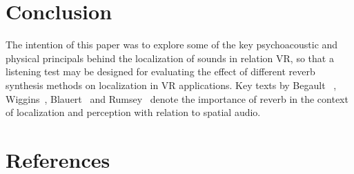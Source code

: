 \documentclass{svproc}
\begin{document}
\section{Conclusion}
The intention of this paper was to explore some of the key psychoacoustic and physical principals behind the localization of sounds in relation VR, so that a listening test may be designed for evaluating the effect of different reverb synthesis methods on localization in VR applications. Key texts by Begault~\cite{Begault1995} , Wiggins~\cite{Wiggins2004}, Blauert~\cite{Blauert1997} and Rumsey~\cite{rumsey2012spatial} denote the importance of reverb in the context of localization and perception with relation to spatial audio.



\newpage
\section{References}

{}

\end{document}
